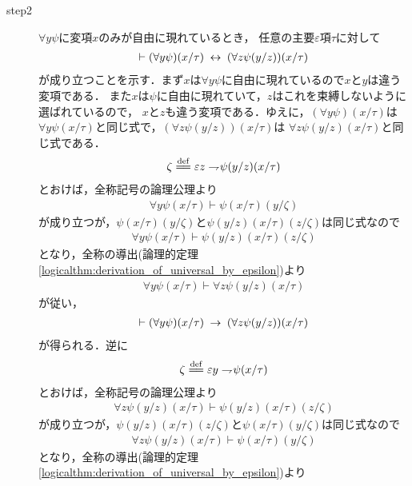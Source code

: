 \begin{sketch}
\begin{description}
			\item[step2]
				$\forall y \psi$に変項$x$のみが自由に現れているとき，
				任意の主要$\varepsilon$項$\tau$に対して
				\begin{align}
					\vdash (\forall y \psi)(x/\tau) \hspace{0.25em}\leftrightarrow\hspace{0.25em} (\forall z \psi(y/z))(x/\tau)
				\end{align}
				が成り立つことを示す．まず$x$は$\forall y \psi$に自由に現れているので$x$と$y$は違う変項である．
				また$x$は$\psi$に自由に現れていて，$z$はこれを束縛しないように選ばれているので，
				$x$と$z$も違う変項である．ゆえに，$(\forall y \psi)(x/\tau)$は
				$\forall y \psi(x/\tau)$と同じ式で，$(\forall z \psi(y/z))(x/\tau)$は
				$\forall z \psi(y/z)(x/\tau)$と同じ式である．
				\begin{align}
					\zeta \defeq \varepsilon z \negation \psi(y/z)(x/\tau)
				\end{align}
				とおけば，全称記号の論理公理より
				\begin{align}
					\forall y \psi(x/\tau) \vdash \psi(x/\tau)(y/\zeta)
				\end{align}
				が成り立つが，$\psi(x/\tau)(y/\zeta)$と$\psi(y/z)(x/\tau)(z/\zeta)$は同じ式なので
				\begin{align}
					\forall y \psi(x/\tau) \vdash \psi(y/z)(x/\tau)(z/\zeta)
				\end{align}
				となり，全称の導出(論理的定理\ref{logicalthm:derivation_of_universal_by_epsilon})より
				\begin{align}
					\forall y \psi(x/\tau) \vdash \forall z \psi(y/z)(x/\tau)
				\end{align}
				が従い，
				\begin{align}
					\vdash (\forall y \psi)(x/\tau) \hspace{0.25em}\rightarrow\hspace{0.25em} (\forall z \psi(y/z))(x/\tau)
					\label{fom:equivalence_by_replacing_bound_variables_3}
				\end{align}
				が得られる．逆に
				\begin{align}
					\zeta \defeq \varepsilon y \negation \psi(x/\tau)
				\end{align}
				とおけば，全称記号の論理公理より
				\begin{align}
					\forall z \psi(y/z)(x/\tau) \vdash \psi(y/z)(x/\tau)(z/\zeta)
				\end{align}
				が成り立つが，$\psi(y/z)(x/\tau)(z/\zeta)$と$\psi(x/\tau)(y/\zeta)$は同じ式なので
				\begin{align}
					\forall z \psi(y/z)(x/\tau) \vdash \psi(x/\tau)(y/\zeta)
				\end{align}
				となり，全称の導出(論理的定理\ref{logicalthm:derivation_of_universal_by_epsilon})より

\end{description}
\end{sketch}
